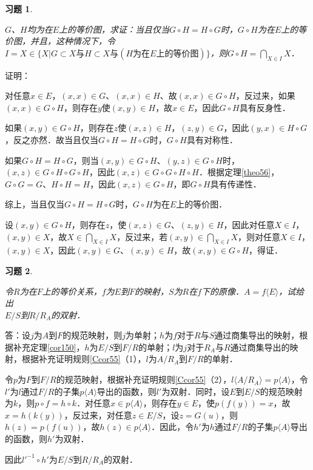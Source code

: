 \documentclass[12pt, a4paper, oneside]{book}
\newtheorem{exer}{习题}
\begin{document}
			\begin{exer}\label{exer72}
				\hfill\par
				$G$、$H$均为在$E$上的等价图，求证：当且仅当$G\circ H=H\circ G$时，$G\circ H$为在$E$上的等价图，并且，这种情况下，令$I={X\in \{X|G\subset X\text{与}H\subset X\text{与}(H\text{为在}E\text{上的等价图})\}}$，则$G\circ H=\bigcap\limits_{X\in I}X$．
			\end{exer}
			证明：
			\par
			对任意$x\in E$，$(x, x)\in G$、$(x, x)\in H$、故$(x, x)\in G\circ H$，反过来，如果$(x, x)\in G\circ H$，则存在$y$使$(x, y)\in H$，故$x\in E$，因此$G\circ H$具有反身性．
			\par
			如果$(x, y)\in G\circ H$，则存在$z$使$(x, z)\in H$，$(z, y)\in G$，因此$(y, x)\in H\circ G$，反之亦然．故当且仅当$G\circ H=H\circ G$时，$G\circ H$具有对称性．
			\par
			如果$G\circ H=H\circ G$，则当$(x, y)\in G\circ H$、$(y, z)\in G\circ H$时，$(x, z)\in G\circ H\circ G\circ H$，因此$(x, z)\in G\circ G\circ H\circ H$．根据定理\ref{theo56}，$G\circ G=G$、$H\circ H=H$，因此$(x, z)\in G\circ H$，即$G\circ H$具有传递性．
			\par
			综上，当且仅当$G\circ H=H\circ G$时，$G\circ H$为在$E$上的等价图．
			\par
			设$(x, y)\in G\circ H$，则存在$z$，使$(x, z)\in G$、$(z, y)\in H$，因此对任意$X\in I$，$(x, y)\in X$，故$X\in \bigcap\limits_{X\in I}X$，反过来，若$(x, y)\in \bigcap\limits_{X\in I}X$，则对任意$X\in I$，$(x, y)\in X$，因此$(x, y)\in G$、$(x, y)\in H$，故$(x, y)\in G\circ H$，得证．
			
			\begin{exer}\label{exer73}
				\hfill\par
				令$R$为在$F$上的等价关系，$f$为$E$到$F$的映射，$S$为$R$在$f$下的原像．$A=f\langle E \rangle $，试给出\\$E/S$到$R/R_A$的双射．
			\end{exer}
			答：设$j$为$A$到$F$的规范映射，则$j$为单射；$h$为$f$对于$R$与$S$通过商集导出的映射，根据补充定理\ref{cor150}，$h$为$E/S$到$F/R$的单射；$l$为$j$对于$R_A$与$R$通过商集导出的映射，根据补充证明规则\ref{Ccor55}（1），$l$为$A/R_A$到$F/R$的单射．
			\par
			令$p$为$F$到$F/R$的规范映射，根据补充证明规则\ref{Ccor55}（2），$l\langle A/R_A\rangle=p\langle A \rangle $，令$l'$为$l$通过$F/R$的子集$p\langle A \rangle $导出的函数，则$l'$为双射．同时，设$E$到$E/S$的规范映射为$k$，则$p\circ f=h\circ k$．对任意$x\in p\langle A \rangle $，则存在$y\in E$，使$p(f(y))=x$，故$x=h(k(y))$，反过来，对任意$z\in E/S$，设$z=G(u)$，则$h(z)=p(f(u))$，故$h(z)\in p\langle A \rangle $．因此，令$h'$为$h$通过$F/R$的子集$p\langle A \rangle $导出的函数，则$h'$为双射．
			\par
			因此${l'}^{-1}\circ h'$为$E/S$到$R/R_A$的双射．
			
\end{document}
